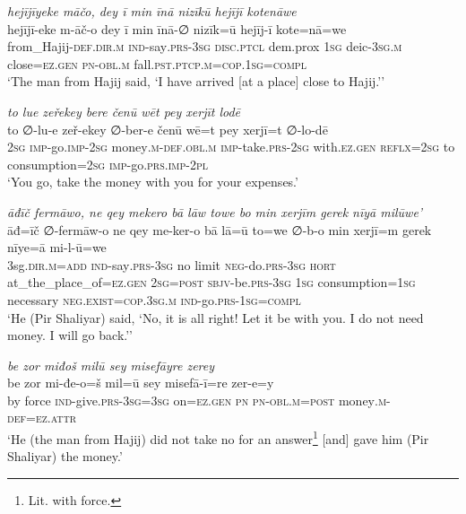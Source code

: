 \ea \label{ŽP.102}
\textit{hejījīyeke māčo, dey ī min īnā nizīkū hejījī kotenāwe} \\ 
\gll hejījī-eke m-āč-o dey ī min īnā-∅ nizīk=ū hejīj-ī kote=nā=we \\ 
 from\_Hajij\textsc{-def}\textsc{.dir}\textsc{.m} \textsc{ind-}say\textsc{.prs}\textsc{-3sg} \textsc{disc.ptcl} dem.prox \textsc{1sg} deic\textsc{-3sg}\textsc{.m} close\textsc{\textsc{=ez.gen}} \textsc{pn}\textsc{-obl}\textsc{.m} fall\textsc{.pst}\textsc{.ptcp}\textsc{.m}\textsc{=cop}\textsc{.\textsc{1sg}}\textsc{=compl} \\ 
\glt `The man from Hajij said, ‘I have arrived [at a place] close to Hajij.’'
\z 
 
\ea \label{ŽP.103}
\textit{to lue zeřekey bere čenū wēt pey xerjīt lodē} \\ 
\gll to ∅-lu-e zeř-ekey ∅-ber-e čenū wē=t pey xerjī=t ∅-lo-dē \\ 
 \textsc{2sg} \textsc{imp-}go.\textsc{imp-}\textsc{2sg} money\textsc{.m}\textsc{-def}\textsc{.obl}\textsc{.m} \textsc{imp-}take\textsc{.prs}-\textsc{2sg} with\textsc{.ez.gen} \textsc{reflx}\textsc{=\textsc{2sg}} to consumption\textsc{=\textsc{2sg}} \textsc{imp-}go\textsc{.prs}.\textsc{imp-}\textsc{2pl} \\ 
\glt `You go, take the money with you for your expenses.'
\z 
 
\ea \label{ŽP.105}
\textit{āđīč fermāwo, ne qey mekero bā lāw towe bo min xerjīm gerek nīyā milūwe’} \\ 
\gll āđ=īč ∅-fermāw-o ne qey me-ker-o bā lā=ū to=we ∅-b-o min xerjī=m gerek nīye=ā mi-l-ū=we \\ 
 3sg\textsc{.dir}\textsc{.m}\textsc{=add} \textsc{ind-}say\textsc{.prs}\textsc{-3sg} no limit \textsc{neg-}do\textsc{.prs}\textsc{-3sg} \textsc{hort} at\_the\_place\_of\textsc{\textsc{=ez.gen}} \textsc{2sg}\textsc{=\textsc{post}} \textsc{sbjv-}be\textsc{.prs}\textsc{-3sg} \textsc{1sg} consumption\textsc{=\textsc{1sg}} necessary \textsc{\textsc{neg.}exist}\textsc{=cop}\textsc{.3sg}\textsc{.m} \textsc{ind-}go\textsc{.prs}\textsc{-\textsc{1sg}}\textsc{=compl} \\ 
\glt `He (Pir Shaliyar) said, ‘No, it is all right! Let it be with you. I do not need money. I will go back.’'
\z 
 
\ea \label{ŽP.107}
\textit{be zor miđoš milū sey misefāyre zerey} \\ 
\gll be zor mi-đe-o=š mil=ū sey misefā-ī=re zer-e=y \\ 
 by force \textsc{ind-}give\textsc{.prs}\textsc{-3sg}\textsc{=3sg} on\textsc{\textsc{=ez.gen}} \textsc{pn} \textsc{pn}\textsc{-obl}\textsc{.m}\textsc{=\textsc{post}} money\textsc{.m}\textsc{-def}\textsc{=ez}.\textsc{attr} \\ 
\glt `He (the man from Hajij) did not take no for an answer\footnote{Lit. with force.} [and] gave him (Pir Shaliyar) the money.'
\z 
 
